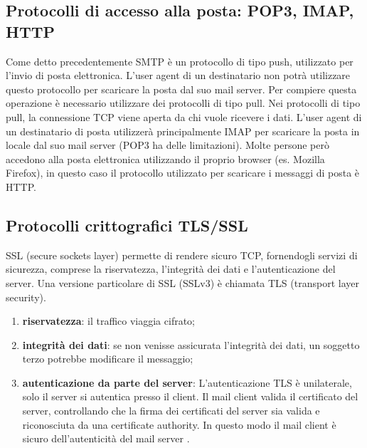 \subsection{Protocolli di accesso alla posta: POP3, IMAP, HTTP}
Come detto precedentemente SMTP è un protocollo di tipo push, 
utilizzato per l’invio di posta elettronica. L’user agent di un destinatario non potrà utilizzare questo 
protocollo per scaricare la posta dal suo mail server. 
Per compiere questa operazione è necessario utilizzare dei protocolli di tipo pull. 
Nei protocolli di tipo pull, la connessione TCP viene aperta da chi vuole ricevere i dati. 
L’user agent di un destinatario di posta utilizzerà principalmente IMAP per scaricare la posta in locale 
dal suo mail server (POP3 ha delle limitazioni). 
Molte persone però accedono alla posta elettronica utilizzando il proprio browser (es. Mozilla Firefox), 
in questo caso il protocollo utilizzato per scaricare i messaggi di posta è HTTP.

\subsection{Protocolli crittografici TLS/SSL}
SSL (secure sockets layer) permette di rendere sicuro TCP,  fornendogli servizi di sicurezza, 
comprese la riservatezza, l’integrità dei dati e l’autenticazione del server. 
Una versione particolare di SSL (SSLv3) è chiamata TLS (transport layer security).

\begin{enumerate}
    \item \textbf{riservatezza}: il traffico viaggia cifrato;
    \item \textbf{integrità dei dati}: se non venisse assicurata l'integrità dei dati, un soggetto terzo
    potrebbe modificare il messaggio;
    \item \textbf{autenticazione da parte del server}: L'autenticazione TLS è unilaterale, solo il server si 
    autentica presso il client. Il mail client valida il certificato del server, controllando che la firma dei 
    certificati del server sia valida e riconosciuta da una certificate authority.
    In questo modo il mail client è sicuro dell'autenticità del mail server \cite{tls}.
\end{enumerate}


